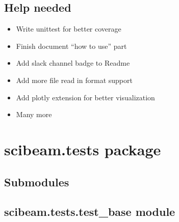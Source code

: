 \documentclass[letterpaper,10pt,english]{sphinxmanual}
\begin{document}
\section{Help needed}
\label{\detokenize{contribute:help-needed}}\begin{itemize}
\item {} 
Write unittest for better coverage

\item {} 
Finish document “how to use” part

\item {} 
Add slack channel badge to Readme

\item {} 
Add more file read in format support

\item {} 
Add plotly extension for better visualization

\item {} 
Many more

\end{itemize}


\chapter{scibeam.tests package}
\label{\detokenize{scibeam.tests:scibeam-tests-package}}\label{\detokenize{scibeam.tests::doc}}

\section{Submodules}
\label{\detokenize{scibeam.tests:submodules}}

\section{scibeam.tests.test\_base module}
\label{\detokenize{scibeam.tests:module-scibeam.tests.test_base}}\label{\detokenize{scibeam.tests:scibeam-tests-test-base-module}}
\end{document}
